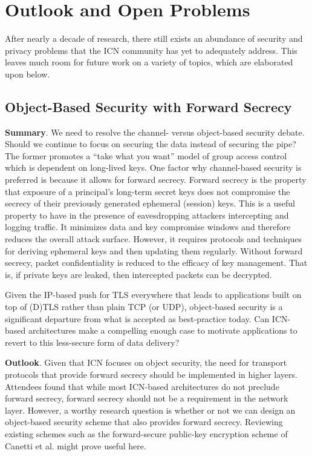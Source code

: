\section{Outlook and Open Problems} \label{sec:outlook}
After nearly a decade of research, there still exists an abundance of security
and privacy problems that the ICN community has yet to adequately address.
This leaves much room for future work on a variety of topics, which are elaborated
upon below. 

\subsection{Object-Based Security with Forward Secrecy}
{\bf Summary}. We need to resolve the channel- versus object-based security debate.
Should we continue to focus on securing the data instead of securing the pipe?
The former promotes a ``take what you want'' model of group access control which
is dependent on long-lived keys.
One factor why channel-based security is preferred is because it allows for forward
secrecy. Forward secrecy is the property that exposure of a principal's long-term secret keys
does not compromise the secrecy of their previously generated ephemeral (session)
keys. This is a useful property to have in the presence of eavesdropping attackers
intercepting and logging traffic. It minimizes data and key compromise windows and
therefore reduces the overall attack surface. However, it requires protocols and
techniques for deriving ephemeral keys and then updating them regularly.
Without forward secrecy, packet confidentiality is reduced to the efficacy of key management.
That is, if private keys are leaked, then intercepted packets can be decrypted.

Given the IP-based push for TLS everywhere that leads to applications built on top of (D)TLS
rather than plain TCP (or UDP), object-based security is a significant departure from
what is accepted as best-practice today. Can ICN-based architectures make a compelling
enough case to motivate applications to revert to this less-secure form of
data delivery?

{\bf Outlook}. Given that ICN focuses on object security, the need for transport
protocols that provide forward secrecy should be implemented in higher layers. Attendees
found that while most ICN-based architectures do not preclude forward secrecy, forward secrecy should
not be a requirement in the network layer. However, a worthy research question is
whether or not we can design an object-based security scheme that
also provides forward secrecy. Reviewing existing schemes such as the forward-secure public-key
encryption scheme of Canetti et al. \cite{canetti2003forward} might prove useful here.


